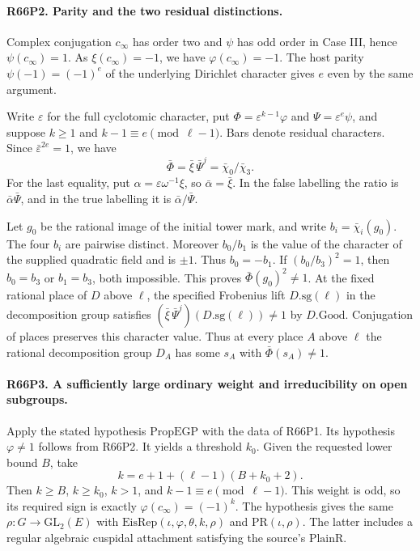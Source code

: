 \paragraph{R66P2. Parity and the two residual distinctions.}
Complex conjugation $c_\infty$ has order two and $\psi$ has odd
order in Case III, hence $\psi(c_\infty)=1$. As $\xi(c_\infty)=-1$,
we have $\varphi(c_\infty)=-1$. The host parity
$\psi(-1)=(-1)^e$ of the underlying Dirichlet character gives
$e$ even by the same argument.

Write $\varepsilon$ for the full cyclotomic character, put
$\Phi=\varepsilon^{k-1}\varphi$ and $\Psi=\varepsilon^e\psi$,
and suppose $k\ge1$ and $k-1\equiv e\pmod{\ell-1}$.
Bars denote residual characters. Since $\bar\varepsilon^{2e}=1$,
we have
\[
   \bar\Phi=\bar\xi\,\bar\Psi^j
       =\bar\chi_0/\bar\chi_3 .
\]
For the last equality, put $\alpha=\varepsilon\omega^{-1}\xi$,
so $\bar\alpha=\bar\xi$. In the false labelling the ratio
is $\bar\alpha\bar\Psi$, and in the true labelling it is
$\bar\alpha/\bar\Psi$.

Let $g_0$ be the rational image of the initial tower mark, and write
$b_i=\bar\chi_i(g_0)$. The four $b_i$ are pairwise distinct.
Moreover $b_0/b_1$ is the value of the character of the supplied
quadratic field and is $\pm1$. Thus $b_0=-b_1$. If
$(b_0/b_3)^2=1$, then $b_0=b_3$ or $b_1=b_3$, both impossible.
This proves $\bar\Phi(g_0)^2\ne1$. At the fixed rational place
of $D$ above $\ell$, the specified Frobenius lift $D.\mathrm{sg}(\ell)$
in the decomposition group satisfies
$(\bar\xi\,\bar\Psi^j)(D.\mathrm{sg}(\ell))\ne1$ by $D.\mathrm{Good}$.
Conjugation of places preserves this character value. Thus at every
place $A$ above $\ell$ the rational decomposition group $D_A$ has
some $s_A$ with $\bar\Phi(s_A)\ne1$.

\paragraph{R66P3. A sufficiently large ordinary weight and irreducibility on open subgroups.}
Apply the stated hypothesis $\mathrm{PropEGP}$ with the data
of R66P1. Its hypothesis $\varphi\ne1$ follows from R66P2.
It yields a threshold $k_0$. Given the requested lower bound $B$, take
\[
           k=e+1+(\ell-1)(B+k_0+2).
\]
Then $k\ge B$, $k\ge k_0$, $k>1$, and $k-1\equiv e\pmod{\ell-1}$.
This weight is odd, so its required sign is exactly
$\varphi(c_\infty)=(-1)^k$. The hypothesis gives the same
$\rho:G\to\mathrm{GL}_2(E)$ with $\mathrm{EisRep}(\iota,\varphi,\theta,k,\rho)$
and $\mathrm{PR}(\iota,\rho)$. The latter includes a regular
algebraic cuspidal attachment satisfying the source's $\mathrm{PlainR}$.

